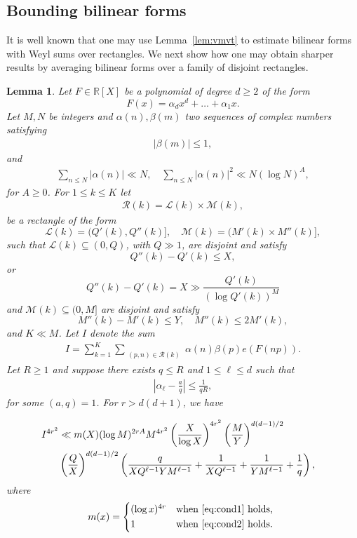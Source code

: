 \documentclass[12pt]{amsart}
\newtheorem{lemma}{Lemma}
\def\cL{{\mathcal L}}
\def\cM{{\mathcal M}}
\def\cR{{\mathcal R}}
\def\R{{\mathbb R}}
\def\\{\cr}
\def\le{\leqslant}
\def\ge{\geqslant}
\begin{document}
\subsection{Bounding bilinear forms}
\label{s31}
It is well known that one may use Lemma~\ref{lem:vmvt} to estimate bilinear forms with Weyl sums over rectangles. We next show how one may obtain sharper results by averaging bilinear forms over a family of disjoint rectangles. 
\begin{lemma}
\label{lem:bilinear1}
Let $F\in \R[X]$ be a polynomial of degree $d\ge 2$  of the form 
$$F(x)=\alpha_d x^{d}+\dots +\alpha_1 x.$$
 Let $M,N$ be integers and $\alpha(n),\beta(m)$ two sequences of complex numbers satisfying 
\begin{align*}
|\beta(m)|\le 1,
\end{align*}
and
\begin{align}
\label{eq:condi}
\sum_{n\le N} |\alpha (n)| \ll N, \quad \sum_{n\le N} |\alpha (n)|^2 \ll N(\log{N})^A,
\end{align}
for $A \ge 0$.
For $1\le k \le K$ let 
\begin{align}
\label{eq:Rk}
\cR(k)=\cL(k)\times \cM(k),
\end{align}
 be a rectangle of the form 
$$\cL(k)=(Q'(k),Q''(k)], \quad \cM(k)=(M'(k)\times M''(k)],$$
such that $\cL(k)\subseteq (0,Q)$, with $Q\gg 1$, are disjoint and satisfy 
\begin{equation}
\label{eq:cond1}
Q''(k)-Q'(k)\le X,
\end{equation}
or
\begin{equation}
\label{eq:cond2}
Q''(k)-Q'(k)= X \gg \frac{ Q'(k)}{(\log Q'(k))^M}
\end{equation}
and $\cM(k)\subseteq (0,M]$ are disjoint and satisfy 
$$M''(k)-M'(k)\le Y, \quad M''(k)\le 2M'(k),$$
and $K\ll M$.
Let $I$ denote the sum 
\begin{align}
\label{eq:Idef}
I=\sum_{k=1}^{K}\sum_{\substack{(p,n)\in \cR(k)}}\alpha(n)\beta(p)e(F(np)).
\end{align}
Let $R\ge 1$ and suppose there exists $q\le R$ and $1\le \ell \le d$ such that 
\begin{align}
\label{eq:alassump}
\left|\alpha_{\ell}-\frac{a}{q}\right|\le \frac{1}{qR},
\end{align}
for some $(a,q)=1$. For $r>d(d+1)$, we have

\begin{align*}
I^{4r^2}& \ll m(X)(\log{M})^{2rA}M^{4r^2}\left(\frac{X}{\log{X}}\right)^{4r^2} \left(\frac{M}{Y}\right)^{d(d-1)/2}\\ &\left(\frac{Q}{X}\right)^{d(d-1)/2}  \left(\frac{q}{XQ^{\ell-1}YM^{\ell-1}}+\frac{1}{XQ^{\ell-1}}+\frac{1}{YM^{\ell-1}}+\frac{1}{q}\right),
\end{align*}
where
$$m(x)=\begin{cases*}
(\log{x})^{4r}& \textit{when} \eqref{eq:cond1} \textit{holds},\\
1 & \textit{when} \eqref{eq:cond2} \textit{holds}.
\end{cases*} $$
\end{lemma}
\end{document}
